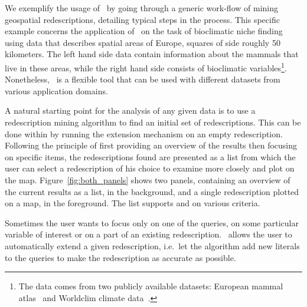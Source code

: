 

We exemplify the usage of \Siren\ by going through a generic work-flow
of mining geospatial redescriptions, detailing typical steps in the
process.  This specific example concerns the application of \Siren\ on
the task of bioclimatic niche finding using data that describes
spatial areas of Europe, squares of side roughly 50 kilometers.  The
left hand side data contain information about the mammals that live
in these areas, while the right hand side consists of bioclimatic
variables\footnote{The data comes from two publicly available
  datasets: European mammal atlas~\cite{mitchell-jones99atlas} and
  Worldclim climate data~\cite{hijmans05very}.}.  Nonetheless, \Siren\
is a flexible tool that can be used with different datasets from
various application domains.


 A natural starting point for the
analysis of any given data is to use a redescription mining algorithm
to find an initial set of redescriptions.  This can be done within 
\Siren{} by running the extension mechanism on an empty redescription.
Following the principle of first providing an overview of the results
then focusing on specific items, the redescriptions found are
presented as a list from which the user can select a redescription of
his choice to examine more closely and plot on the map.
Figure~\ref{fig:both_panels} shows two panels, containing an overview of
the current results as a list, in the background, and a single
redescription plotted on a map, in the foreground.
The list supports  and  on various criteria.

 Sometimes the user wants to focus only
on one of the queries, on some particular variable of interest or on a
part of an existing redescription.  \Siren\ allows the user to
automatically extend a given redescription, i.e.\ let the algorithm
add new literals to the queries to make the redescription as accurate
as possible.

